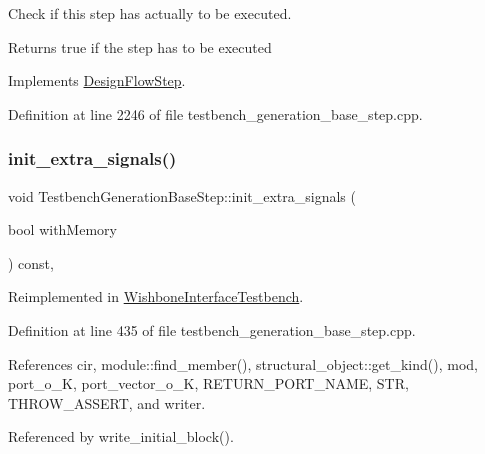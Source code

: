 Check if this step has actually to be executed. 

\begin{DoxyReturn}{Returns}
true if the step has to be executed 
\end{DoxyReturn}


Implements \hyperlink{classDesignFlowStep_a1783abe0c1d162a52da1e413d5d1ef05}{Design\+Flow\+Step}.



Definition at line 2246 of file testbench\+\_\+generation\+\_\+base\+\_\+step.\+cpp.

\mbox{\label{classTestbenchGenerationBaseStep_a8f0da7801c3e9c8050240d9567d70bc9}} 
\subsubsection{\texorpdfstring{init\+\_\+extra\+\_\+signals()}{init\_extra\_signals()}}
{\footnotesize\ttfamily void Testbench\+Generation\+Base\+Step\+::init\+\_\+extra\+\_\+signals (\begin{DoxyParamCaption}\item[{bool}]{with\+Memory }\end{DoxyParamCaption}) const\hspace{0.3cm}{\ttfamily [protected]}, {\ttfamily [virtual]}}



Reimplemented in \hyperlink{classWishboneInterfaceTestbench_ab6123ce32d28cf46681575d10c293158}{Wishbone\+Interface\+Testbench}.



Definition at line 435 of file testbench\+\_\+generation\+\_\+base\+\_\+step.\+cpp.



References cir, module\+::find\+\_\+member(), structural\+\_\+object\+::get\+\_\+kind(), mod, port\+\_\+o\+\_\+K, port\+\_\+vector\+\_\+o\+\_\+K, R\+E\+T\+U\+R\+N\+\_\+\+P\+O\+R\+T\+\_\+\+N\+A\+ME, S\+TR, T\+H\+R\+O\+W\+\_\+\+A\+S\+S\+E\+RT, and writer.



Referenced by write\+\_\+initial\+\_\+block().

